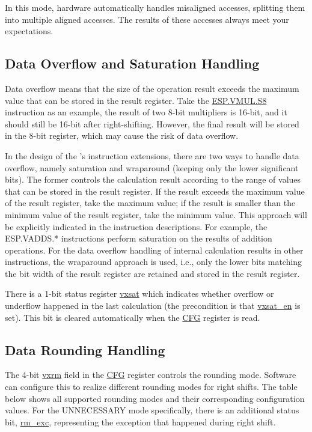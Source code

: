 \documentclass[main\_\_EN.tex]{subfiles}
\begin{document}
In this mode, hardware automatically handles misaligned accesses, splitting them into multiple aligned accesses. The results of these accesses always meet your expectations.

\subsection{Data Overflow and Saturation Handling}

Data overflow means that the size of the operation result exceeds the maximum value that can be stored in the result register. Take the \hyperref[instruction:ESPVMULS8]{ESP.VMUL.S8} instruction as an example, the result of two 8-bit multipliers is 16-bit, and it should still be 16-bit after right-shifting. However, the final result will be stored in the 8-bit register, which may cause the risk of data overflow.

In the design of the \chipname{}'s instruction extensions, there are two ways to handle data overflow, namely saturation and wraparound (keeping only the lower significant bits). The former controls the calculation result according to the range of values that can be stored in the result register. If the result exceeds the maximum value of the result register, take the maximum value; if the result is smaller than the minimum value of the result register, take the minimum value. This approach will be explicitly indicated in the instruction descriptions. For example, the ESP.VADDS.* instructions perform saturation on the results of addition operations. For the data overflow handling of internal calculation results in other instructions, the wraparound approach is used, i.e., only the lower bits matching the bit width of the result register are retained and stored in the result register.


There is a 1-bit status register \hyperref[vxsat]{vxsat} which indicates whether overflow or underflow happened in the last calculation (the precondition is that \hyperref[vxsat_en]{vxsat\_en} is set). This bit is cleared automatically when the \hyperref[regdesc:ESPCFG]{CFG} register is read.

\subsection{Data Rounding Handling}

The 4-bit \hyperref[vxrm]{vxrm} field in the \hyperref[regdesc:ESPCFG]{CFG} register controls the rounding mode. Software can configure this to realize different rounding modes for right shifts. The table below shows all supported rounding modes and their corresponding configuration values. For the UNNECESSARY mode specifically, there is an additional status bit, \hyperref[rm_exc]{rm\_exc}, representing the exception that happened during right shift.
\end{document}
